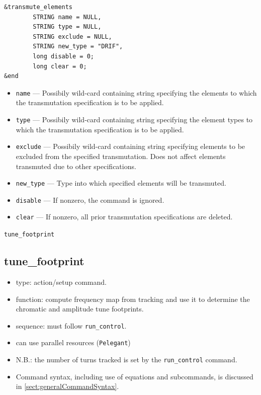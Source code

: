 \documentclass[11pt]{article}
\begin{document}
\begin{verbatim}
&transmute_elements
        STRING name = NULL,
        STRING type = NULL,
        STRING exclude = NULL,
        STRING new_type = "DRIF",
        long disable = 0;
        long clear = 0;
&end
\end{verbatim}

\begin{itemize}
\item \verb|name| --- Possibily wild-card containing string specifying the
	elements to which the transmutation specification is to be applied.
\item \verb|type| --- Possibily wild-card containing string specifying the
	element types to which the transmutation specification is to be applied.
\item \verb|exclude| --- Possibily wild-card containing string specifying 
	elements to be excluded from the specified transmutation.  Does not
	affect elements transmuted due to other specifications.
\item \verb|new_type| --- Type into which specified elements will be transmuted.
\item \verb|disable| --- If nonzero, the command is ignored.
\item \verb|clear| --- If nonzero, all prior transmutation specifications are deleted.
\end{itemize}

\newpage
\begin{center}{\Large\verb|tune_footprint|}\end{center}
\subsection{tune\_footprint \label{subsec:tunefootprint}}

\begin{itemize}
\item type: action/setup command.  
\item function: compute frequency map from tracking and use it to determine the 
  chromatic and amplitude tune footprints.
\item sequence: must follow \verb|run_control|.
\item can use parallel resources (\verb|Pelegant|)
\item N.B.: the number of turns tracked is set by the \verb|run_control| command.
\item Command syntax, including use of equations and subcommands, is discussed in \ref{sect:generalCommandSyntax}.
\end{itemize}
\end{document}
